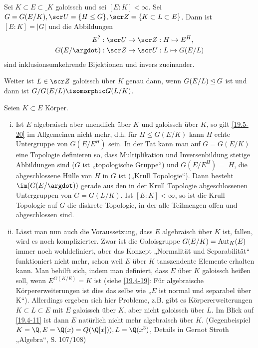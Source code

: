 \begin{kor} \label{19.4-21}
	Sei $K \subset E \subset \_K$ galoissch und sei $[E : K] < \infty$.
	Sei $G = G(E / K), \scr U = \{H \le G\}, \scr Z = \{ K \subset L \subset E \}$.
	Dann ist $[E : K] = |G|$ und die Abbildungen
	\begin{align*}
		E^?: \scr U &\to \scr Z: H \mapsto E^H, \\
		G(E / \argdot) : \scr Z &\to \scr U : L \mapsto G(E / L)
	\end{align*}
	sind inklusionsumkehrende Bijektionen und invers zueinander.

	Weiter ist $L \in \scr Z$ galoissch über $K$ genau dann, wenn $G(E / L) \mathbin{\trianglelefteq} G$ ist und dann ist $G / G(E / L) \isomorphic G(L / K)$.
\end{kor}

\begin{nt} \label{19.4-22}
	Seien $K \subset E$ Körper.
	\begin{enumerate}[i)]
		\item
			Ist $E$ algebraisch aber unendlich über $K$ und galoissch über $K$, so gilt \ref{19.5-20} im Allgemeinen nicht mehr, d.h. für $H \le G(E / K)$ kann $H$ echte Untergruppe von $G(E / E^H)$ sein.
			In der Tat kann man auf $G = G(E / K)$ eine Topologie definieren so, dass Multiplikation und Inversenbildung stetige Abbildungen sind ($G$ ist „topologische Gruppe“) und $G(E / E^H) = \_H$, die abgeschlossene Hülle von $H$ in $G$ ist („Krull Topologie“).
			Dann besteht $\im(G(E / \argdot))$ gerade aus den in der Krull Topologie abgeschlossenen Untergruppen von $G = G(L / K)$.
			Ist $[E : K] < \infty$, so ist die Krull Topologie auf $G$ die diskrete Topologie, in der alle Teilmengen offen und abgeschlossen sind.
		\item
			Lässt man nun auch die Voraussetzung, dass $E$ algebraisch über $K$ ist, fallen, wird es noch komplizierter.
			Zwar ist die Galoisgruppe $G(E / K) = \operatorname{Aut}_K(E)$ immer noch wohldefiniert, aber das Konzept „Normalität und Separabilität“ funktioniert nicht mehr, schon weil $E$ über $K$ tanszendente Elemente erhalten kann.
			Man behilft sich, indem man definiert, dass $E$ über $K$ galoissch heißen soll, wenn $E^{G(K / E)} = K$ ist (siehe \ref{19.4-19}: Für algebraische Körpererweiterungen ist dies das selbe wie „$E$ ist normal und separabel über K“).
			Allerdings ergeben sich hier Probleme, z.B. gibt es Körpererweiterungen $K \subset L \subset E$ mit $E$ galoissch über $K$, aber nicht galoissch über $L$.
			Im Blick auf \ref{19.4-11} ist dann $E$ natürlich nicht mehr algebraisch über $K$.
			(Gegenbeispiel $K = \Q, E = \Q(x) = Q(\Q[x])), L = \Q(x^3)$, Details in Gernot Stroth „Algebra“, S. 107/108) %
	\end{enumerate}
\end{nt}

